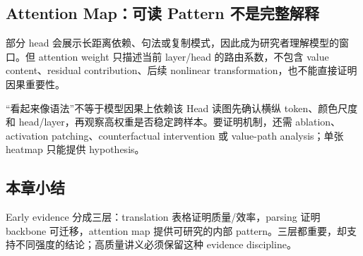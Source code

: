 \subsection{Attention Map：可读 Pattern 不是完整解释}

部分 head 会展示长距离依赖、句法或复制模式，因此成为研究者理解模型的窗口。但 attention weight 只描述当前 layer/head 的路由系数，不包含 value content、residual contribution、后续 nonlinear transformation，也不能直接证明因果重要性。


\begin{warningbox}{“看起来像语法”不等于模型因果上依赖该 Head}
读图先确认横纵 token、颜色尺度和 head/layer，再观察高权重是否稳定跨样本。要证明机制，还需 ablation、activation patching、counterfactual intervention 或 value-path analysis；单张 heatmap 只能提供 hypothesis。
\end{warningbox}


\subsection{本章小结}

Early evidence 分成三层：translation 表格证明质量/效率，parsing 证明 backbone 可迁移，attention map 提供可研究的内部 pattern。三层都重要，却支持不同强度的结论；高质量讲义必须保留这种 evidence discipline。

